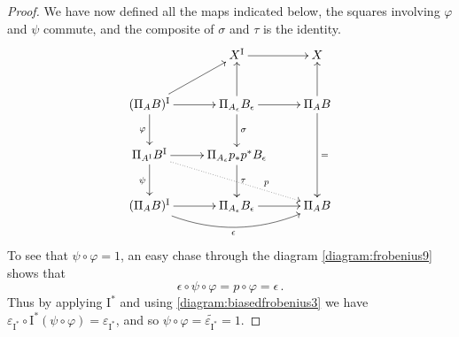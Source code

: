 \documentclass[11pt]{amsart}
\newcommand{\ra}{\ensuremath{\rightarrow}}
\newcommand{\I}{\ensuremath{\mathrm{I}}}
\theoremstyle{remark}
\theoremstyle{definition}
\begin{document}
\begin{proof}
We have now defined all the maps indicated below, the squares involving $\varphi$ and $\psi$ commute, and the  composite of $\sigma$ and $\tau$  is the identity.
\begin{equation}\label{diagram:frobenius9}
\xymatrix{
& X^\I \ar[r] & X \\
 (\Pi_AB)^\I  \ar[r]  \ar[ru] \ar[d]_{\varphi} 
 	& \Pi_{A_\epsilon}B_\epsilon  \ar[u] \ar[d]^\sigma \ar[r] & \Pi_{A}B \ar[u]\ar[dd]^= \\
 \Pi_{A^\I}B^\I \ar[r] \ar[d]_{\psi} \ar@{..>}[rrd]^>>>>>>>>>>>{p} 
 	& \Pi_{A_\epsilon} p_*p^* B_\epsilon \ar[d]^\tau & \\
  (\Pi_AB)^\I  \ar[r] \ar@/_4ex/ [rr]_\epsilon & \Pi_{A_\epsilon}B_\epsilon \ar[r] & \Pi_{A}B 
}
\end{equation}
%
To see that $\psi\circ\varphi = 1$, an easy chase through the diagram \eqref{diagram:frobenius9} shows that
\[
\epsilon\circ \psi\circ\varphi = p \circ \varphi = \epsilon\,.
\]
Thus by applying $\I^*$ and using \eqref{diagram:biasedfrobenius3} we have $
\varepsilon_{\I^*} \circ \I^*(\psi \circ\varphi) = \varepsilon_{\I^*}$, 
and so $\psi \circ\varphi = \widetilde{\varepsilon_{\I^*}} = 1$.

%
%


\end{proof}
\end{document}
